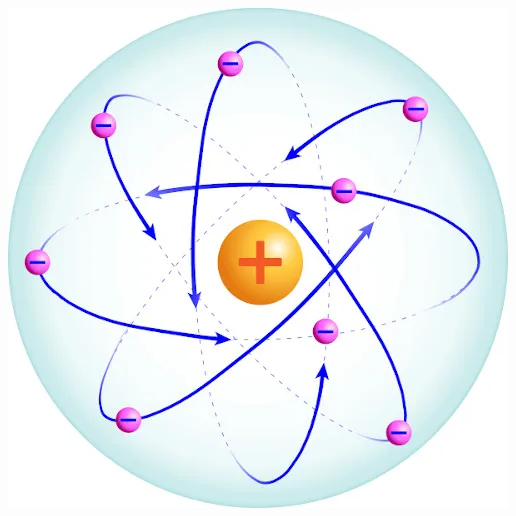 \documentclass[12pt]{scrartcl}
\begin{document}
\begin{exercise}
\begin{choice}
\choice \includegraphics[scale=.2]{Adaptadas/ruther.png}
\end{choice}
\end{exercise}
\end{document}
